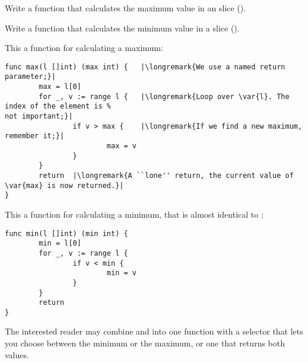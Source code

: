 \begin{Exercise}[title={Minimum and maximum},difficulty=0]
\label{ex:minmax}
\Question\label{ex:minmax q1} Write a function that calculates the
maximum value in an  slice ().

\Question\label{ex:minmax q2} Write a function that calculates the
minimum value in a  slice ().

\end{Exercise}

\begin{Answer}
\Question This a function for calculating a maximum:
\begin{lstlisting}
func max(l []int) (max int) {   |\longremark{We use a named return parameter;}|
        max = l[0]      
        for _, v := range l {   |\longremark{Loop over \var{l}. The index of the element is %
not important;}|
                if v > max {    |\longremark{If we find a new maximum, remember it;}|
                        max = v 
                }   
        }   
        return  |\longremark{A ``lone'' return, the current value of \var{max} is now returned.}|
}
\end{lstlisting}
\showremarks

\Question This a function for calculating a minimum, that is almost identical to :
\begin{lstlisting}
func min(l []int) (min int) {
        min = l[0]
        for _, v := range l { 
                if v < min {
                        min = v 
                }   
        }   
        return
}
\end{lstlisting}
The interested reader may combine  and  into one function with a selector
that lets you choose between the minimum or the maximum, or one that returns both values.
\end{Answer}
